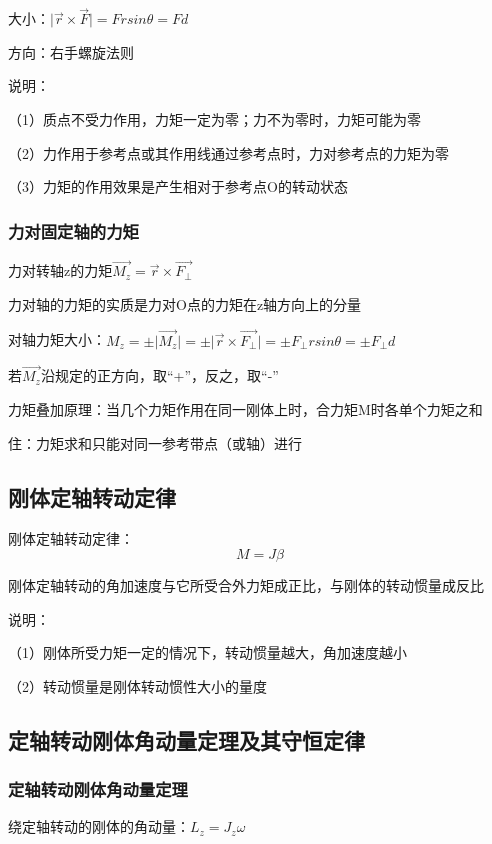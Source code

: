 \documentclass[UTF8]{article}
\begin{document}
    大小：$\lvert \vec{r}\times\vec{F}\rvert = Frsin\theta = Fd$

    方向：右手螺旋法则

    说明：

    \;\;\;（1）质点不受力作用，力矩一定为零；力不为零时，力矩可能为零

    \;\;（2）力作用于参考点或其作用线通过参考点时，力对参考点的力矩为零

    \;\;（3）力矩的作用效果是产生相对于参考点O的转动状态

\subsubsection{力对固定轴的力矩}

    力对转轴z的力矩$\vec{M_z} = \vec{r}\times\vec{F_{\bot}}$

    力对轴的力矩的实质是力对O点的力矩在z轴方向上的分量

    对轴力矩大小：$M_z = \pm\lvert\vec{M_z}\rvert = \pm\lvert\vec{r}\times\vec{F_{\bot}}\rvert = \pm F_{\bot}rsin\theta = \pm F_{\bot}d$

    若$\vec{M_z}$沿规定的正方向，取“+”，反之，取“-”

    力矩叠加原理：当几个力矩作用在同一刚体上时，合力矩M时各单个力矩之和

    住：力矩求和只能对同一参考带点（或轴）进行

\subsection{刚体定轴转动定律}

    刚体定轴转动定律：\[M = J\beta\]

    刚体定轴转动的角加速度与它所受合外力矩成正比，与刚体的转动惯量成反比

    说明：

    \;\;\;（1）刚体所受力矩一定的情况下，转动惯量越大，角加速度越小

    \;\;（2）转动惯量是刚体转动惯性大小的量度

\subsection{定轴转动刚体角动量定理及其守恒定律}
\subsubsection{定轴转动刚体角动量定理}

    绕定轴转动的刚体的角动量：$L_z = J_z\omega$
\end{document}
